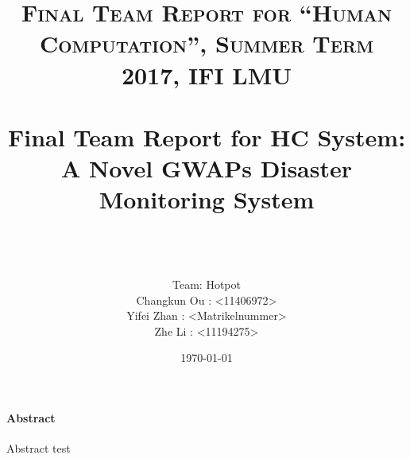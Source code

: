 \documentclass[paper=a4, fontsize=11pt]{scrartcl}
\title{	
\normalfont \normalsize 
\textsc{Final Team Report for ``Human Computation'', Summer Term 2017, IFI LMU} \\ [25pt]
\horrule{0.5pt} \\[0.4cm]
\huge Final Team Report for HC System: \\
A Novel GWAPs Disaster Monitoring System\\
\horrule{2pt} \\[0.5cm] %
}
\author{
  \\ Team: Hotpot\\
  Changkun Ou : <11406972> \\
  Yifei Zhan : <Matrikelnummer> \\
  Zhe Li : <11194275>  }
\date{\today}
\theoremstyle{definition}
\numberwithin{equation}{section}
\numberwithin{figure}{section}
\numberwithin{table}{section}
\begin{document}
\maketitle

\tableofcontents

\paragraph{Abstract}

Abstract test







\nocite{*}


\end{document}
